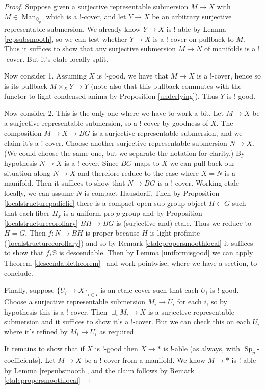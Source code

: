 \documentclass[12pt]{article}
\newcommand{\on}{\operatorname}
\newcommand{\mbb}{\mathbb}
\newcommand{\wh}{\widehat}
\begin{document}
\begin{proof}
Suppose given a surjective representable submersion $M\to X$ with $M\in\on{Man}_{\mbb{Q}_p}$ which is a $!$-cover, and let $Y\to X$ be an arbitrary surjective representable submersion.  We already know $Y\to X$ is $!$-able by Lemma \ref{repsubsmooth}, so we can test whether $Y\to X$ is a $!$-cover on pullback to $M$.  Thus it suffices to show that any surjective submersion $M\to N$ of manifolds is a $!$-cover.  But it's etale locally split.

Now consider 1.  Assuming $X$ is $!$-good, we have that $M\to X$ is a $!$-cover, hence so is its pullback $M\times_XY \to Y$ (note also that this pullback commutes with the functor to light condensed anima by Proposition \ref{underlying}).  Thus $Y$ is $!$-good.

Now consider 2.  This is the only one where we have to work a bit.  Let $M\to X$ be a surjective representable submersion, so a $!$-cover by goodness of $X$.  The composition $M\to X \to BG$ is a surjective representable submersion, and we claim it's a $!$-cover.  Choose another surjective representable submersion $N\to X$.  (We could choose the same one, but we separate the notation for clarity.)  By hypothesis $N\to X$ is a $!$-cover.  Since $BG$ maps to $X$ we can pull back our situation along $N\to X$ and therefore reduce to the case where $X=N$ is a manifold.  Then it suffices to show that $N\to BG$ is a $!$-cover.  Working etale locally, we can assume $N$ is compact Hausdorff.  Then by Proposition \ref{localstructurepadiclie} there is a compact open sub-group object $H\subset G$ such that each fiber $H_x$ is a uniform pro-$p$-group and by Proposition \ref{localstructurecorollary} $BH \to BG$ is (surjective and) etale.  Thus we reduce to $H=G$.  Then $f:N\to BH$ is proper because $H$ is light profinite (\ref{localstructurecorollary}) and so by Remark \ref{etalepropersmoothlocal} it suffices to show that $f_\ast\mbb{S}$ is descendable.  Then by Lemma \ref{uniformisgood} we can apply Theorem \ref{descendabletheorem}  and work pointwise, where we have a section, to conclude.

Finally, suppose $\{U_i\to X\}_{i\in I}$ is an etale cover such that each $U_i$ is $!$-good.  Choose a surjective representable submersion $M_i \to U_i$ for each $i$, so by hypothesis this is a $!$-cover.  Then $\sqcup_i M_i \to X$ is a surjective representable submersion and it suffices to show it's a $!$-cover.  But we can check this on each $U_i$ where it's refined by $M_i \to U_i$ as required.

It remains to show that if $X$ is $!$-good then $X\to \ast$ is $!$-able (as always, with $\on{Sp}_{\wh{p}}$-coefficients).  Let $M\to X$ be a $!$-cover from a manifold.  We know $M\to \ast$ is $!$-able by Lemma \ref{repsubsmooth}, and the claim follows by Remark \ref{etalepropersmoothlocal}
\end{proof}
\end{document}
